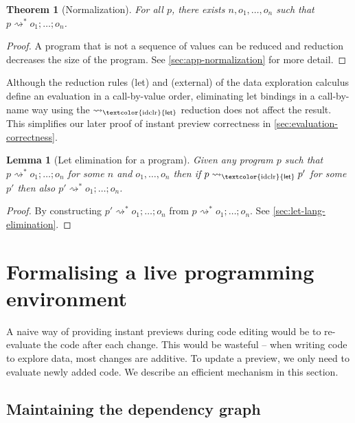 \documentclass[english,crc,references=cleveref]{programming}
\newcounter{thc}
\theoremstyle{plain}
\newtheorem{lem}[thc]{Lemma}
\newtheorem{theorem}[thc]{Theorem}
\theoremstyle{definition}
\newcommand{\ident}[1]{\textnormal{\textcolor{idclr}{\sffamily #1}}}
\newcommand{\rname}[1]{{\sffamily(#1)}}
\begin{document}
\begin{theorem}[Normalization]
\label{thm:normalization}
For all $p$, there exists $n, o_1, \ldots, o_n$ such that $p\rightsquigarrow^{*} o_1;\ldots;o_n$.
\end{theorem}
\begin{proof}
A program that is not a sequence of values can be reduced and reduction decreases the size of the
program. See \cref{sec:app-normalization} for more detail.
\end{proof}
%
%
Although the reduction rules \rname{let} and \rname{external} of the data exploration calculus
define an evaluation in a call-by-value order, eliminating let bindings in a call-by-name way
using the $\rightsquigarrow_\ident{let}$ reduction does not affect the result. This
simplifies our later proof of instant preview correctness in \cref{sec:evaluation-correctness}.

\begin{lem}[Let elimination for a program]
\label{thm:let-lang-elimination}
Given any program $p$ such that $p \rightsquigarrow^{*} o_1;\ldots;o_n$ for some $n$ and $o_1, \ldots, o_n$
then if $p \rightsquigarrow_\ident{let} p'$ for some $p'$ then also $p' \rightsquigarrow^{*} o_1;\ldots;o_n$.
\end{lem}
\begin{proof}
By constructing $p' \rightsquigarrow^{*} o_1;\ldots;o_n$ from
$p \rightsquigarrow^{*} o_1;\ldots;o_n$. See \cref{sec:let-lang-elimination}.
\end{proof}


\section{Formalising a live programming environment}
\label{sec:formal}

A naive way of providing instant previews during code editing would be to re-evaluate the code
after each change. This would be wasteful -- when writing code to explore data, most changes are
additive. To update a preview, we only need to evaluate newly added code. We describe an
efficient mechanism in this section.


\subsection{Maintaining the dependency graph}
\label{sec:formal-deps}
\end{document}
